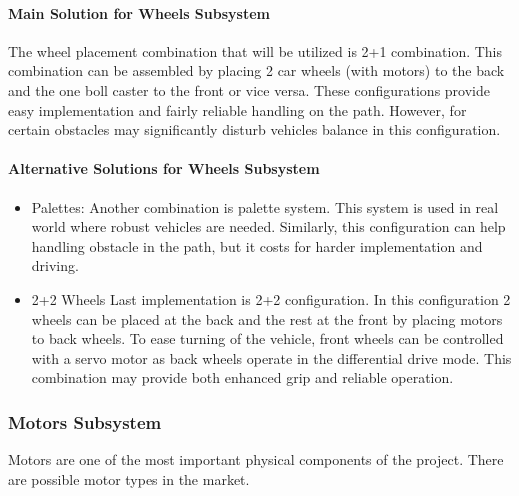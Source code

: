 \documentclass[a4paper,12pt]{article}
\begin{document}
	\paragraph{Main Solution for Wheels Subsystem}
	
	The wheel placement combination that will be utilized is 2+1 combination. This combination can be assembled by placing 2 car wheels (with motors) to the back and the one boll caster to the front or vice versa. These configurations provide easy implementation and fairly reliable handling on the path. However, for certain obstacles may significantly disturb vehicles balance in this configuration.\\
	
	\paragraph{Alternative Solutions for Wheels Subsystem}
	\begin{itemize}
		\item{Palettes:} 	Another combination is palette system. This system is used in real world where robust vehicles are needed. Similarly, this configuration can help handling obstacle in the path, but it costs for harder implementation and driving.
		
		\item{2+2 Wheels} 	Last implementation is 2+2 configuration. In this configuration 2 wheels can be placed at the back and the rest at the front by placing motors to back wheels. To ease turning of the vehicle, front wheels can be controlled with a servo motor as back wheels operate in the differential drive mode. This combination may provide both enhanced grip and reliable	 operation.
	\end{itemize}

	

	
	\subsubsection{Motors Subsystem}
	Motors are one of the most important physical components of the project. There are possible motor types in the market.\\
	
\end{document}
